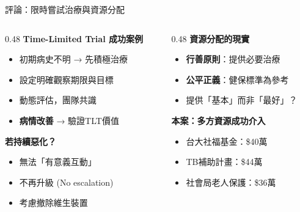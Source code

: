 \documentclass[aspectratio=169,12pt]{beamer}
\begin{document}
\begin{frame}{評論：限時嘗試治療與資源分配}

\begin{columns}[T]
\begin{column}{0.48\textwidth}
\textcolor{ethicsgreen}{\textbf{Time-Limited Trial 成功案例}}
\begin{itemize}
    \item 初期病史不明 → 先積極治療
    \item 設定明確觀察期限與目標
    \item 動態評估，團隊共識
    \item \textbf{病情改善} → 驗證TLT價值
\end{itemize}

\vspace{0.3cm}
\textcolor{ntuhred}{\textbf{若持續惡化？}}
\begin{itemize}
    \item 無法「有意義互動」
    \item 不再升級 (No escalation)
    \item 考慮撤除維生裝置
\end{itemize}
\end{column}

\begin{column}{0.48\textwidth}
\textcolor{ntuhblue}{\textbf{資源分配的現實}}

\begin{itemize}
    \item \textbf{行善原則}：提供必要治療
    \item \textbf{公平正義}：健保標準為參考
    \item 提供「基本」而非「最好」？
\end{itemize}

\vspace{0.3cm}
\textcolor{ethicsgreen}{\textbf{本案：多方資源成功介入}}
\begin{itemize}
    \item 台大社福基金：\$40萬
    \item TB補助計畫：\$44萬
    \item 社會局老人保護：\$36萬
\end{itemize}
\end{column}
\end{columns}

\end{frame}
\end{document}
